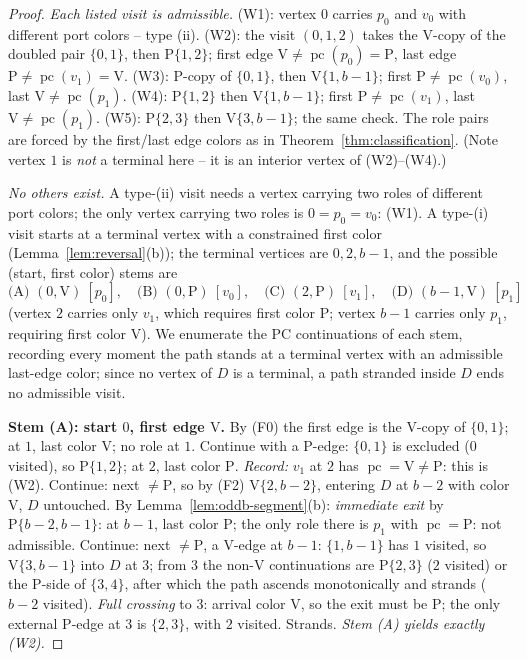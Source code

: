 \documentclass[11pt]{article}
\theoremstyle{definition}
\DeclareMathOperator{\pc}{pc}
\begin{document}
\begin{proof}
\emph{Each listed visit is admissible.} (W1): vertex $0$ carries $p_0$ and $v_0$ with
different port colors -- type (ii). (W2): the visit $(0,1,2)$ takes the V-copy of the
doubled pair $\{0,1\}$, then $\mathrm P\{1,2\}$; first edge
$\mathrm V \ne \pc(p_0) = \mathrm P$, last edge
$\mathrm P \ne \pc(v_1) = \mathrm V$. (W3): P-copy of $\{0,1\}$, then
$\mathrm V\{1,b-1\}$; first $\mathrm P \ne \pc(v_0)$, last
$\mathrm V \ne \pc(p_1)$. (W4): $\mathrm P\{1,2\}$ then $\mathrm V\{1,b-1\}$; first
$\mathrm P \ne \pc(v_1)$, last $\mathrm V \ne \pc(p_1)$. (W5): $\mathrm P\{2,3\}$ then
$\mathrm V\{3,b-1\}$; the same check. The role pairs are forced by the first/last edge
colors as in Theorem~\ref{thm:classification}. (Note vertex $1$ is \emph{not} a
terminal here -- it is an interior vertex of (W2)--(W4).)

\emph{No others exist.} A type-(ii) visit needs a vertex carrying two roles of
different port colors; the only vertex carrying two roles is $0 = p_0 = v_0$: (W1). A
type-(i) visit starts at a terminal vertex with a constrained first color
(Lemma~\ref{lem:reversal}(b)); the terminal vertices are $0, 2, b-1$, and the possible
(start, first color) stems are
\[
\text{(A) } (0, \mathrm V)\ [p_0], \quad
\text{(B) } (0, \mathrm P)\ [v_0], \quad
\text{(C) } (2, \mathrm P)\ [v_1], \quad
\text{(D) } (b-1, \mathrm V)\ [p_1]
\]
(vertex $2$ carries only $v_1$, which requires first color $\mathrm P$; vertex $b-1$
carries only $p_1$, requiring first color $\mathrm V$). We enumerate the PC
continuations of each stem, recording every moment the path stands at a terminal
vertex with an admissible last-edge color; since no vertex of $D$ is a terminal, a
path stranded inside $D$ ends no admissible visit.

\smallskip
\noindent\textbf{Stem (A): start $0$, first edge $\mathrm V$.} By (F0) the first edge
is the V-copy of $\{0,1\}$; at $1$, last color $\mathrm V$; no role at $1$. Continue
with a P-edge: $\{0,1\}$ is excluded ($0$ visited), so $\mathrm P\{1,2\}$; at $2$,
last color $\mathrm P$. \emph{Record:} $v_1$ at $2$ has
$\pc = \mathrm V \ne \mathrm P$: this is (W2). Continue: next $\ne \mathrm P$, so by
(F2) $\mathrm V\{2,b-2\}$, entering $D$ at $b-2$ with color $\mathrm V$, $D$
untouched. By Lemma~\ref{lem:oddb-segment}(b):
\emph{immediate exit} by $\mathrm P\{b-2,b-1\}$: at $b-1$, last color $\mathrm P$; the
only role there is $p_1$ with $\pc = \mathrm P$: not admissible. Continue: next
$\ne \mathrm P$, a V-edge at $b-1$: $\{1,b-1\}$ has $1$ visited, so
$\mathrm V\{3,b-1\}$ into $D$ at $3$; from $3$ the non-$\mathrm V$ continuations are
$\mathrm P\{2,3\}$ ($2$ visited) or the P-side of $\{3,4\}$, after which the path
ascends monotonically and strands ($b-2$ visited). \emph{Full crossing} to $3$:
arrival color $\mathrm V$, so the exit must be $\mathrm P$; the only external P-edge
at $3$ is $\{2,3\}$, with $2$ visited. Strands. \emph{Stem (A) yields exactly (W2).}


\end{proof}
\end{document}
